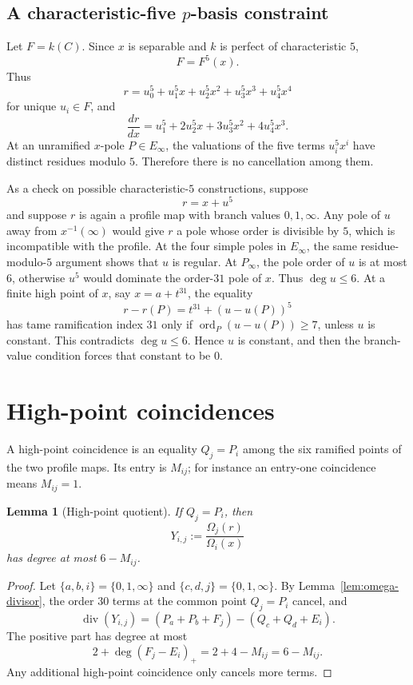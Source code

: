 \documentclass[11pt]{amsart}
\newtheorem{lemma}[theorem]{Lemma}
\newcommand{\Div}{\operatorname{div}}
\newcommand{\ord}{\operatorname{ord}}
\begin{document}
\subsection{A characteristic-five \(p\)-basis constraint}

Let \(F=k(C)\).  Since \(x\) is separable and \(k\) is perfect of
characteristic \(5\),
\[
  F=F^5(x).
\]
Thus
\[
  r=u_0^5+u_1^5x+u_2^5x^2+u_3^5x^3+u_4^5x^4
\]
for unique \(u_i\in F\), and
\[
  \frac{dr}{dx}=u_1^5+2u_2^5x+3u_3^5x^2+4u_4^5x^3.
\]
At an unramified \(x\)-pole \(P\in E_\infty\), the valuations of the five
terms \(u_i^5x^i\) have distinct residues modulo \(5\).  Therefore there is
no cancellation among them.

As a check on possible characteristic-\(5\) constructions, suppose
\[
  r=x+u^5
\]
and suppose \(r\) is again a profile map with branch values \(0,1,\infty\).
Any pole of \(u\) away from \(x^{-1}(\infty)\) would give \(r\) a pole whose
order is divisible by \(5\), which is incompatible with the profile.  At the
four simple poles in \(E_\infty\), the same residue-modulo-\(5\) argument shows
that \(u\) is regular.  At \(P_\infty\), the pole order of \(u\) is at most
\(6\), otherwise \(u^5\) would dominate the order-\(31\) pole of \(x\).
Thus \(\deg u\le6\).  At a finite high point of \(x\), say
\(x=a+t^{31}\), the equality
\[
  r-r(P)=t^{31}+(u-u(P))^5
\]
has tame ramification index \(31\) only if \(\ord_P(u-u(P))\ge7\), unless
\(u\) is constant.  This contradicts \(\deg u\le6\).  Hence \(u\) is constant,
and then the branch-value condition forces that constant to be \(0\).

\section{High-point coincidences}
\label{sec:highpoint}

A high-point coincidence is an equality \(Q_j=P_i\) among the six ramified
points of the two profile maps.  Its entry is \(M_{ij}\); for instance an
entry-one coincidence means \(M_{ij}=1\).

\begin{lemma}[High-point quotient]
\label{lem:highpoint-quotient}
If \(Q_j=P_i\), then
\[
  Y_{i,j}:=\frac{\Omega_j(r)}{\Omega_i(x)}
\]
has degree at most \(6-M_{ij}\).
\end{lemma}

\begin{proof}
Let \(\{a,b,i\}=\{0,1,\infty\}\) and
\(\{c,d,j\}=\{0,1,\infty\}\).  By Lemma~\ref{lem:omega-divisor}, the order
\(30\) terms at the common point \(Q_j=P_i\) cancel, and
\[
  \Div(Y_{i,j})
  =
  (P_a+P_b+F_j)-(Q_c+Q_d+E_i).
\]
The positive part has degree at most
\[
  2+\deg(F_j-E_i)_+=2+4-M_{ij}=6-M_{ij}.
\]
Any additional high-point coincidence only cancels more terms.
\end{proof}
\end{document}
